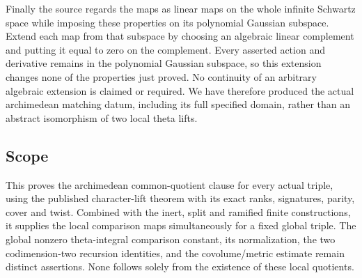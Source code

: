 Finally the source regards the maps as linear maps on the
whole infinite Schwartz space while imposing these properties
on its polynomial Gaussian subspace. Extend each map from that
subspace by choosing an algebraic linear complement and putting
it equal to zero on the complement.
Every asserted action and derivative remains in the polynomial
Gaussian subspace, so this extension changes none of the
properties just proved. No continuity of an arbitrary algebraic
extension is claimed or required. We have therefore produced
the actual archimedean matching datum, including its full
specified domain, rather than an abstract isomorphism of two
local theta lifts.

\subsection{Scope}
This proves the archimedean common-quotient clause for every
actual triple, using the published character-lift theorem with
its exact ranks, signatures, parity, cover and twist.
Combined with the inert, split and ramified finite constructions,
it supplies the local comparison maps simultaneously for a
fixed global triple.
The global nonzero theta-integral comparison constant, its
normalization, the two codimension-two recursion identities,
and the covolume/metric estimate remain distinct assertions.
None follows solely from the existence of these local quotients.
